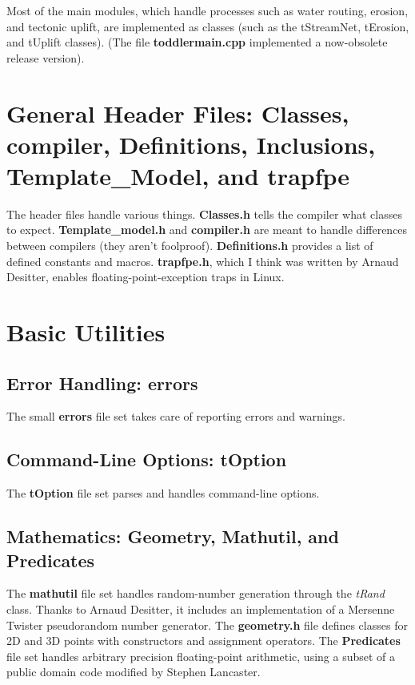 \documentclass[12pt]{article}
\begin{document}
Most of the main modules, which handle processes such as water routing, erosion, and tectonic uplift, are implemented as classes (such as the tStreamNet, tErosion, and tUplift classes). (The file {\bf toddlermain.cpp} implemented a now-obsolete release version).

\section{General Header Files: Classes, compiler, Definitions, Inclusions, Template\_Model, and trapfpe}

The header files handle various things. {\bf Classes.h} tells the compiler 
what classes to expect. {\bf Template\_model.h} and {\bf compiler.h} are meant 
to handle differences between compilers (they aren't foolproof). 
{\bf Definitions.h} provides a list of defined constants and macros. 
{\bf trapfpe.h}, which I think was written by Arnaud Desitter, enables 
floating-point-exception traps in Linux.

\section{Basic Utilities}

\subsection{Error Handling: errors}

The small {\bf errors} file set takes care of reporting errors and warnings.

\subsection{Command-Line Options: tOption}

The {\bf tOption} file set parses and handles command-line options.

\subsection{Mathematics: Geometry, Mathutil, and Predicates}

The {\bf mathutil} file set handles random-number generation through the 
{\em tRand} class. Thanks to Arnaud Desitter, it includes an implementation of 
a Mersenne Twister pseudorandom number generator. The {\bf geometry.h} file 
defines classes for 2D and 3D points with constructors and assignment 
operators. The {\bf Predicates} file set handles arbitrary precision 
floating-point arithmetic, using a subset of a public domain code modified by 
Stephen Lancaster.
\end{document}
